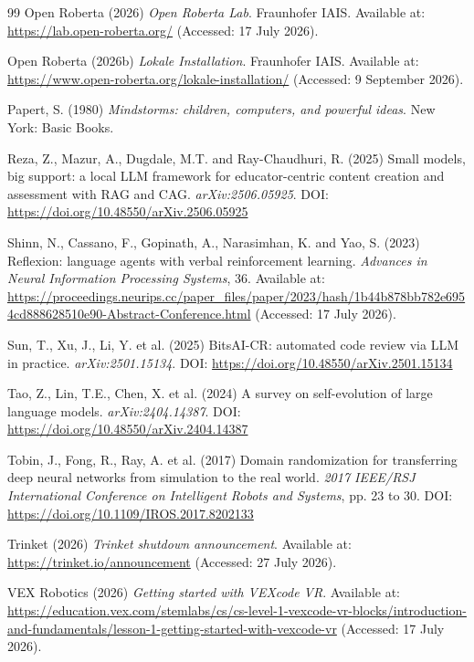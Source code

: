 \documentclass[11pt,a4paper]{report}
\begin{document}
\begin{thebibliography}{99}
 Open Roberta (2026) \textit{Open Roberta Lab}. Fraunhofer IAIS. Available at: \url{https://lab.open-roberta.org/} (Accessed: 17 July 2026).

 Open Roberta (2026b) \textit{Lokale Installation}. Fraunhofer IAIS. Available at: \url{https://www.open-roberta.org/lokale-installation/} (Accessed: 9 September 2026).

 Papert, S. (1980) \textit{Mindstorms: children, computers, and powerful ideas}. New York: Basic Books.

 Reza, Z., Mazur, A., Dugdale, M.T. and Ray-Chaudhuri, R. (2025) Small models, big support: a local LLM framework for educator-centric content creation and assessment with RAG and CAG. \textit{arXiv:2506.05925}. DOI: \url{https://doi.org/10.48550/arXiv.2506.05925}

 Shinn, N., Cassano, F., Gopinath, A., Narasimhan, K. and Yao, S. (2023) Reflexion: language agents with verbal reinforcement learning. \textit{Advances in Neural Information Processing Systems}, 36. Available at: \url{https://proceedings.neurips.cc/paper_files/paper/2023/hash/1b44b878bb782e6954cd888628510e90-Abstract-Conference.html} (Accessed: 17 July 2026).

 Sun, T., Xu, J., Li, Y. et al. (2025) BitsAI-CR: automated code review via LLM in practice. \textit{arXiv:2501.15134}. DOI: \url{https://doi.org/10.48550/arXiv.2501.15134}

 Tao, Z., Lin, T.E., Chen, X. et al. (2024) A survey on self-evolution of large language models. \textit{arXiv:2404.14387}. DOI: \url{https://doi.org/10.48550/arXiv.2404.14387}

 Tobin, J., Fong, R., Ray, A. et al. (2017) Domain randomization for transferring deep neural networks from simulation to the real world. \textit{2017 IEEE/RSJ International Conference on Intelligent Robots and Systems}, pp. 23 to 30. DOI: \url{https://doi.org/10.1109/IROS.2017.8202133}

 Trinket (2026) \textit{Trinket shutdown announcement}. Available at: \url{https://trinket.io/announcement} (Accessed: 27 July 2026).

 VEX Robotics (2026) \textit{Getting started with VEXcode VR}. Available at: \url{https://education.vex.com/stemlabs/cs/cs-level-1-vexcode-vr-blocks/introduction-and-fundamentals/lesson-1-getting-started-with-vexcode-vr} (Accessed: 17 July 2026).


\end{thebibliography}
\end{document}
